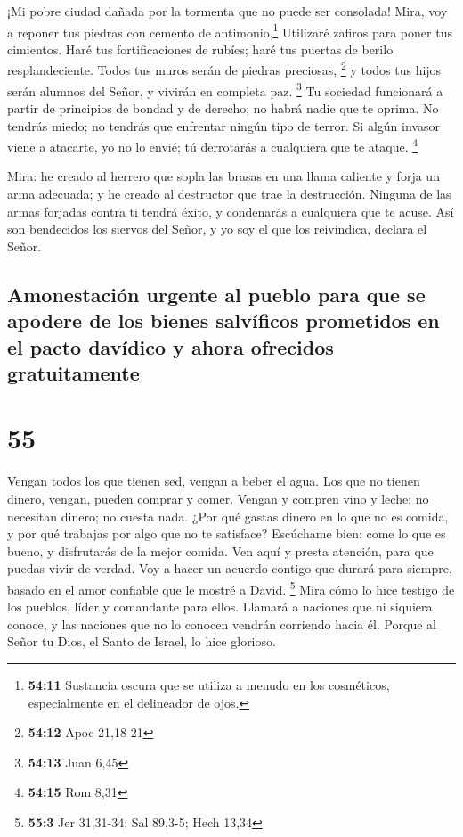  ¡Mi pobre ciudad dañada por la tormenta que no puede ser
consolada! Mira, voy a reponer tus piedras con cemento de
antimonio,\footnote{\textbf{54:11} Sustancia oscura que se utiliza a
  menudo en los cosméticos, especialmente en el delineador de ojos.}
Utilizaré zafiros para poner tus cimientos.  Haré tus
fortificaciones de rubíes; haré tus puertas de berilo resplandeciente.
Todos tus muros serán de piedras preciosas, \footnote{\textbf{54:12}
  Apoc 21,18-21}  y todos tus hijos serán alumnos del
Señor, y vivirán en completa paz. \footnote{\textbf{54:13} Juan 6,45}
 Tu sociedad funcionará a partir de principios de bondad
y de derecho; no habrá nadie que te oprima. No tendrás miedo; no tendrás
que enfrentar ningún tipo de terror.  Si algún invasor
viene a atacarte, yo no lo envié; tú derrotarás a cualquiera que te
ataque. \footnote{\textbf{54:15} Rom 8,31}

 Mira: he creado al herrero que sopla las brasas en una
llama caliente y forja un arma adecuada; y he creado al destructor que
trae la destrucción.  Ninguna de las armas forjadas
contra ti tendrá éxito, y condenarás a cualquiera que te acuse. Así son
bendecidos los siervos del Señor, y yo soy el que los reivindica,
declara el Señor.

\hypertarget{amonestaciuxf3n-urgente-al-pueblo-para-que-se-apodere-de-los-bienes-salvuxedficos-prometidos-en-el-pacto-davuxeddico-y-ahora-ofrecidos-gratuitamente}{%
\subsection{Amonestación urgente al pueblo para que se apodere de los
bienes salvíficos prometidos en el pacto davídico y ahora ofrecidos
gratuitamente}\label{amonestaciuxf3n-urgente-al-pueblo-para-que-se-apodere-de-los-bienes-salvuxedficos-prometidos-en-el-pacto-davuxeddico-y-ahora-ofrecidos-gratuitamente}}

\hypertarget{section-54}{%
\section{55}\label{section-54}}

 Vengan todos los que tienen sed, vengan a beber el agua.
Los que no tienen dinero, vengan, pueden comprar y comer. Vengan y
compren vino y leche; no necesitan dinero; no cuesta nada.
 ¿Por qué gastas dinero en lo que no es comida, y por qué
trabajas por algo que no te satisface? Escúchame bien: come lo que es
bueno, y disfrutarás de la mejor comida.  Ven aquí y
presta atención, para que puedas vivir de verdad. Voy a hacer un acuerdo
contigo que durará para siempre, basado en el amor confiable que le
mostré a David. \footnote{\textbf{55:3} Jer 31,31-34; Sal 89,3-5; Hech
  13,34}  Mira cómo lo hice testigo de los pueblos, líder
y comandante para ellos.  Llamará a naciones que ni
siquiera conoce, y las naciones que no lo conocen vendrán corriendo
hacia él. Porque al Señor tu Dios, el Santo de Israel, lo hice glorioso.

